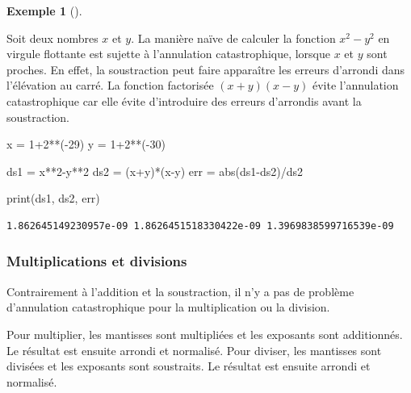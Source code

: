 \documentclass[
  letterpaper,
]{scrbook}
\newenvironment{Shaded}{\begin{snugshade}}{\end{snugshade}}
\newcommand{\BuiltInTok}[1]{\textcolor[rgb]{0.00,0.50,0.00}{#1}}
\newcommand{\DecValTok}[1]{\textcolor[rgb]{0.25,0.63,0.44}{#1}}
\newcommand{\NormalTok}[1]{\textcolor[rgb]{0.00,0.44,0.13}{#1}}
\newcommand{\OperatorTok}[1]{\textcolor[rgb]{0.40,0.40,0.40}{#1}}
\theoremstyle{plain}
\theoremstyle{definition}
\theoremstyle{definition}
\newtheorem{example}{Exemple}[chapter]
\theoremstyle{remark}
\begin{document}
\begin{example}[]\protect\hypertarget{exm-difference-de-carres}{}\label{exm-difference-de-carres}

Soit deux nombres \(x\) et \(y\). La manière naïve de calculer la
fonction \(x^2-y^2\) en virgule flottante est sujette à l'annulation
catastrophique, lorsque \(x\) et \(y\) sont proches. En effet, la
soustraction peut faire apparaître les erreurs d'arrondi dans
l'élévation au carré. La fonction factorisée \((x+y)(x-y)\) évite
l'annulation catastrophique car elle évite d'introduire des erreurs
d'arrondis avant la soustraction.

\begin{Shaded}
\begin{Highlighting}[]
\NormalTok{x }\OperatorTok{=} \DecValTok{1}\OperatorTok{+}\DecValTok{2}\OperatorTok{**}\NormalTok{(}\OperatorTok{{-}}\DecValTok{29}\NormalTok{)}
\NormalTok{y }\OperatorTok{=} \DecValTok{1}\OperatorTok{+}\DecValTok{2}\OperatorTok{**}\NormalTok{(}\OperatorTok{{-}}\DecValTok{30}\NormalTok{)}

\NormalTok{ds1 }\OperatorTok{=}\NormalTok{ x}\OperatorTok{**}\DecValTok{2}\OperatorTok{{-}}\NormalTok{y}\OperatorTok{**}\DecValTok{2}
\NormalTok{ds2 }\OperatorTok{=}\NormalTok{ (x}\OperatorTok{+}\NormalTok{y)}\OperatorTok{*}\NormalTok{(x}\OperatorTok{{-}}\NormalTok{y)}
\NormalTok{err }\OperatorTok{=} \BuiltInTok{abs}\NormalTok{(ds1}\OperatorTok{{-}}\NormalTok{ds2)}\OperatorTok{/}\NormalTok{ds2}

\BuiltInTok{print}\NormalTok{(ds1, ds2, err)}
\end{Highlighting}
\end{Shaded}

\begin{verbatim}
1.862645149230957e-09 1.8626451518330422e-09 1.3969838599716539e-09
\end{verbatim}

\end{example}

\hypertarget{multiplications-et-divisions}{%
\subsubsection{Multiplications et
divisions}\label{multiplications-et-divisions}}

Contrairement à l'addition et la soustraction, il n'y a pas de problème
d'annulation catastrophique pour la multiplication ou la division.

Pour multiplier, les mantisses sont multipliées et les exposants sont
additionnés. Le résultat est ensuite arrondi et normalisé. Pour diviser,
les mantisses sont divisées et les exposants sont soustraits. Le
résultat est ensuite arrondi et normalisé.
\end{document}
